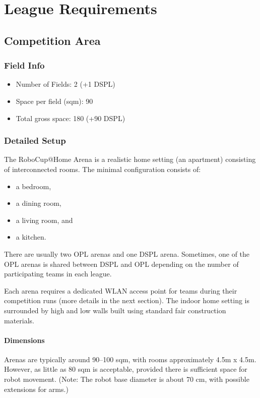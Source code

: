 \section{League Requirements}
\label{appendix:league-requirements}

\subsection{Competition Area}

\subsubsection{Field Info}
\begin{itemize}
    \item Number of Fields: 2 (+1 DSPL)
    \item Space per field (sqm): 90
    \item Total gross space: 180 (+90 DSPL)
\end{itemize}

\subsubsection{Detailed Setup}
The RoboCup@Home Arena is a realistic home setting (an apartment) consisting of interconnected rooms. The minimal configuration consists of:
\begin{itemize}
    \item a bedroom,
    \item a dining room,
    \item a living room, and
    \item a kitchen.
\end{itemize}

There are usually two OPL arenas and one DSPL arena. Sometimes, one of the OPL arenas is shared between DSPL and OPL depending on the number of participating teams in each league.

Each arena requires a dedicated WLAN access point for teams during their competition runs (more details in the next section). The indoor home setting is surrounded by high and low walls built using standard fair construction materials.

\paragraph{Dimensions} Arenas are typically around 90--100 sqm, with rooms approximately 4.5m x 4.5m. However, as little as 80 sqm is acceptable, provided there is sufficient space for robot movement. (Note: The robot base diameter is about 70 cm, with possible extensions for arms.)

